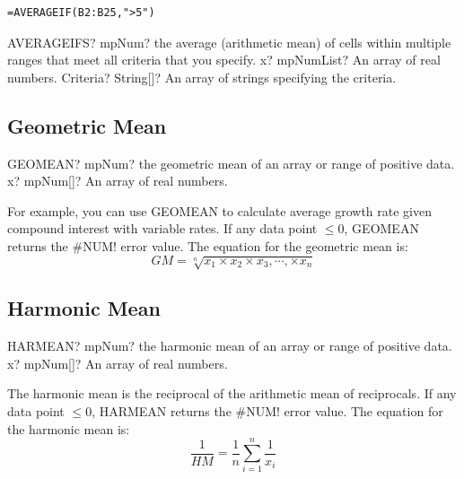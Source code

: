 \begin{verbatim}
=AVERAGEIF(B2:B25,">5")
\end{verbatim}


\vspace{0.3cm}
\begin{mpFunctionsExtract}
	\mpWorksheetFunctionTwoNotImplemented
	{AVERAGEIFS? mpNum? the average (arithmetic mean) of cells within multiple ranges that meet all criteria that you specify.}
	{x? mpNumList? An array of real numbers.}
	{Criteria? String[]? An array of strings specifying the criteria.}
\end{mpFunctionsExtract}




\subsection{Geometric Mean}

\begin{mpFunctionsExtract}
	\mpWorksheetFunctionOneNotImplemented
	{GEOMEAN? mpNum? the geometric mean of an array or range of positive data.}
	{x? mpNum[]? An array of real numbers.}
\end{mpFunctionsExtract}

\vspace{0.3cm}
For example, you can use GEOMEAN to calculate average growth rate given compound interest with variable rates.
If any data point $\leq 0$, GEOMEAN returns the \#NUM! error value. 
The equation for the geometric mean is:
\begin{equation}
	GM=\sqrt[n]{x_1 \times x_2 \times x_3, \cdots, \times x_n}
\end{equation}



\subsection{Harmonic Mean}

\begin{mpFunctionsExtract}
	\mpWorksheetFunctionOneNotImplemented
	{HARMEAN? mpNum? the harmonic mean of an array or range of positive data.}
	{x? mpNum[]? An array of real numbers.}
\end{mpFunctionsExtract}

\vspace{0.3cm}
The harmonic mean is the reciprocal of the arithmetic mean of reciprocals.
If any data point $\leq 0$, HARMEAN returns the \#NUM! error value. 
The equation for the harmonic mean is:
\begin{equation}
	\frac{1}{HM}=\frac{1}{n} \sum_{i=1}^n \frac{1}{x_i}
\end{equation}






